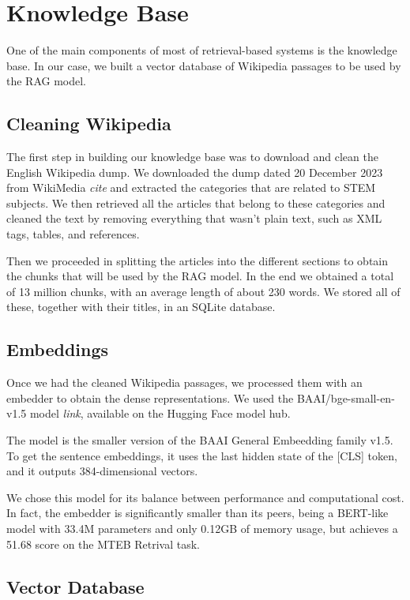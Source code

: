 \documentclass[11pt]{article}
\begin{document}
\section{Knowledge Base}

One of the main components of most of retrieval-based systems is the knowledge base.
In our case, we built a vector database of Wikipedia passages to be used by the RAG model.

\subsection{Cleaning Wikipedia}

The first step in building our knowledge base was to download and clean the English
Wikipedia dump. We downloaded the dump dated 20 December 2023 from WikiMedia \textit{cite} 
and extracted the categories that are related to STEM subjects. 
We then retrieved all the articles that belong to these categories and cleaned the text
by removing everything that wasn't plain text, such as XML tags, tables, and references.

Then we proceeded in splitting the articles into the different sections to obtain the chunks 
that will be used by the RAG model. 
In the end we obtained a total of 13 million chunks, with an average length of about 230 words.
We stored all of these, together with their titles, in an SQLite database.

\subsection{Embeddings}

Once we had the cleaned Wikipedia passages, we processed them with an embedder to obtain the dense 
representations.
We used the BAAI/bge-small-en-v1.5 model \textit{link}, available on the Hugging Face model hub.

The model is the smaller version of the BAAI General Embeedding family v1.5. 
To get the sentence embeddings, it uses the last hidden state of the [CLS] token, and it outputs 
384-dimensional vectors.

We chose this model for its balance between performance and computational cost.
In fact, the embedder is significantly smaller than its peers, being a BERT-like model with 33.4M 
parameters and only 0.12GB of memory usage, but achieves a 51.68 score on the MTEB Retrival task.



\subsection{Vector Database}
\end{document}

